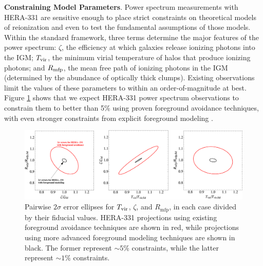 \documentclass[preprint]{aastex}
\newcommand{\compress}{\vspace{-0.3in}}
\newcommand{\Caption}[4]{\vspace{#1}\renewcommand{\baselinestretch}{#2}\caption{#4}\vspace{#3}}
\begin{document}

{\bf Constraining Model Parameters}. Power spectrum measurements with HERA-331 are sensitive enough to place strict constraints on theoretical models of
reionization and even to test the fundamental assumptions of those models.  Within the standard framework,
three terms determine the major features of the power spectrum: $\zeta$, the efficiency at which galaxies
release ionizing photons  into the IGM; $T_{\rm vir}$, the minimum virial temperature of halos that produce
ionizing photons; and $R_{\rm mfp}$, the mean free path of ionizing
photons in the IGM (determined by the abundance of optically thick clumps).  Existing
observations limit the values of these parameters to within an order-of-magnitude at best.
Figure \ref{fig:ErrorEllipses} shows that we expect
HERA-331 power spectrum observations to constrain them to better
than 5\% using proven foreground avoidance techniques, with even stronger constraints from
explicit foreground modeling \citep{pober_et_al2014}.

\begin{figure}[t]\centering
\includegraphics[width=\textwidth]{plots/Pspec/OPTMIDellipses.pdf}
\Caption{-0.3in}{0.9}{-0.15in}{\small
Pairwise $2\sigma$ error ellipses for $T_{\rm vir}$, $\zeta$, and $R_\textrm{mfp}$, in each case divided by their fiducial values.  HERA-331 projections using existing foreground avoidance techniques are shown in red, while projections using more advanced foreground modeling techniques are shown in black.  The former represent $\sim 5\%$ constraints, while the latter represent $\sim 1\%$ constraints.\label{fig:ErrorEllipses}}
\end{figure}
\end{document}

